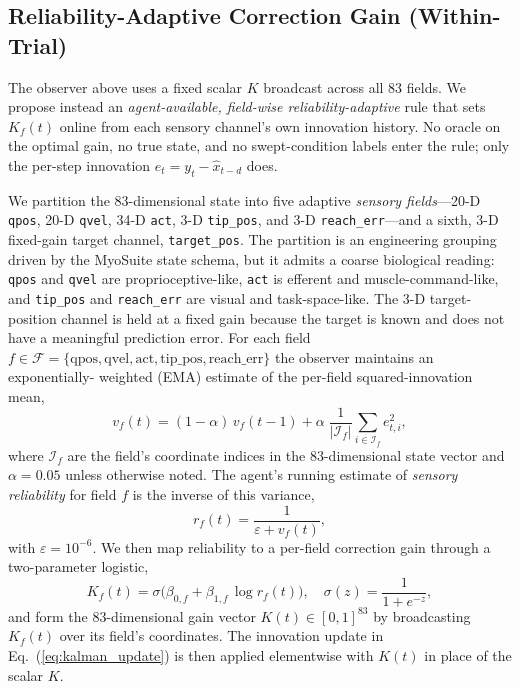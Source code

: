 \documentclass[sn-mathphys,NameDate,iicol]{sn-jnl}
\begin{document}
\subsection{Reliability-Adaptive Correction Gain (Within-Trial)}
\label{sec:method-reliability}
The observer above uses a fixed scalar $K$ broadcast across all 83
fields. We propose instead an \emph{agent-available, field-wise
reliability-adaptive} rule that sets $K_f(t)$ online from each
sensory channel's own innovation history. No oracle on the optimal
gain, no true state, and no swept-condition labels enter the rule;
only the per-step innovation $e_t \!=\! y_t \!-\! \hat x_{t-d}$ does.

We partition the 83-dimensional state into five adaptive \emph{sensory
fields}---20-D \texttt{qpos}, 20-D \texttt{qvel}, 34-D \texttt{act},
3-D \texttt{tip\_pos}, and 3-D \texttt{reach\_err}---and a sixth,
3-D fixed-gain target channel, \texttt{target\_pos}. The
partition is an engineering grouping driven by the MyoSuite state
schema, but it admits a coarse biological reading: \texttt{qpos} and
\texttt{qvel} are proprioceptive-like, \texttt{act} is efferent and
muscle-command-like, and \texttt{tip\_pos} and \texttt{reach\_err} are
visual and task-space-like. The
3-D target-position channel is held at a fixed gain because the
target is known and does not have a meaningful prediction error.
For each field $f\!\in\!\mathcal{F}\!=\!\{\mathrm{qpos},
\mathrm{qvel}, \mathrm{act}, \mathrm{tip\_pos},
\mathrm{reach\_err}\}$ the observer maintains an exponentially-%
weighted (EMA) estimate of the per-field squared-innovation mean,
\begin{equation}
v_f(t) = (1-\alpha)\,v_f(t-1) + \alpha\;
 \frac{1}{|\mathcal{I}_f|}\sum_{i \in \mathcal{I}_f} e_{t,i}^{2},
\label{eq:ema_innovation_var}
\end{equation}
where $\mathcal{I}_f$ are the field's coordinate indices in the
83-dimensional state vector and $\alpha\!=\!0.05$ unless otherwise noted.
The agent's running estimate of \emph{sensory reliability} for
field $f$ is the inverse of this variance,
\begin{equation}
r_f(t) = \frac{1}{\varepsilon + v_f(t)},
\label{eq:reliability}
\end{equation}
with $\varepsilon\!=\!10^{-6}$. We then map reliability to a
per-field correction gain through a two-parameter logistic,
\begin{equation}
K_f(t) = \sigma\bigl(\beta_{0,f} + \beta_{1,f}\,\log r_f(t)\bigr),
\quad \sigma(z)\!=\!\frac{1}{1+e^{-z}},
\label{eq:Kf_logistic}
\end{equation}
and form the 83-dimensional gain vector $K(t)\!\in\![0,1]^{83}$ by
broadcasting $K_f(t)$ over its field's coordinates. The
innovation update in Eq.~(\ref{eq:kalman_update}) is then applied
elementwise with $K(t)$ in place of the scalar $K$.
\end{document}
